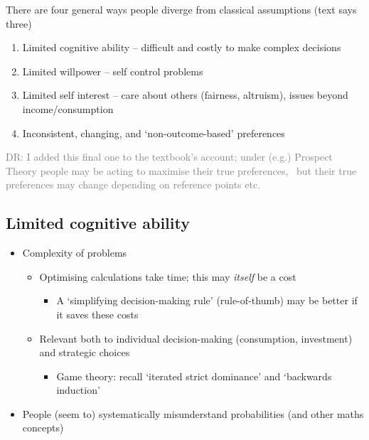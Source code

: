 \documentclass[]{article}
\providecommand{\tightlist}{%
  \setlength{\itemsep}{0pt}\setlength{\parskip}{0pt}}
\begin{document}
There are four general ways people diverge from classical assumptions (text says three)

\begin{enumerate}
\def\labelenumi{\arabic{enumi}.}
\item
  Limited cognitive ability -- difficult and costly to make complex decisions
\item
  Limited willpower -- self control problems
\item
  Limited self interest -- care about others (fairness, altruism), issues beyond income/consumption
\item
  Inconsistent, changing, and `non-outcome-based' preferences
\end{enumerate}

\textcolor{gray}{DR: I added this final one to the textbook's account; under (e.g.) Prospect Theory people may be acting to maximise their true preferences, \
 but their true preferences may change depending on reference points etc.}

\hypertarget{limited-cognitive-ability}{%
\subsection{Limited cognitive ability}\label{limited-cognitive-ability}}

\begin{itemize}
\tightlist
\item
  Complexity of problems

  \begin{itemize}
  \tightlist
  \item
    Optimising calculations take time; this may \emph{itself} be a cost

    \begin{itemize}
    \tightlist
    \item
      A `simplifying decision-making rule' (rule-of-thumb) may be better if it saves these costs
    \end{itemize}
  \item
    Relevant both to individual decision-making (consumption, investment) and strategic choices

    \begin{itemize}
    \tightlist
    \item
      Game theory: recall `iterated strict dominance' and `backwards induction'
    \end{itemize}
  \end{itemize}
\item
  People (seem to) systematically misunderstand probabilities (and other maths concepts)
\end{itemize}
\end{document}
